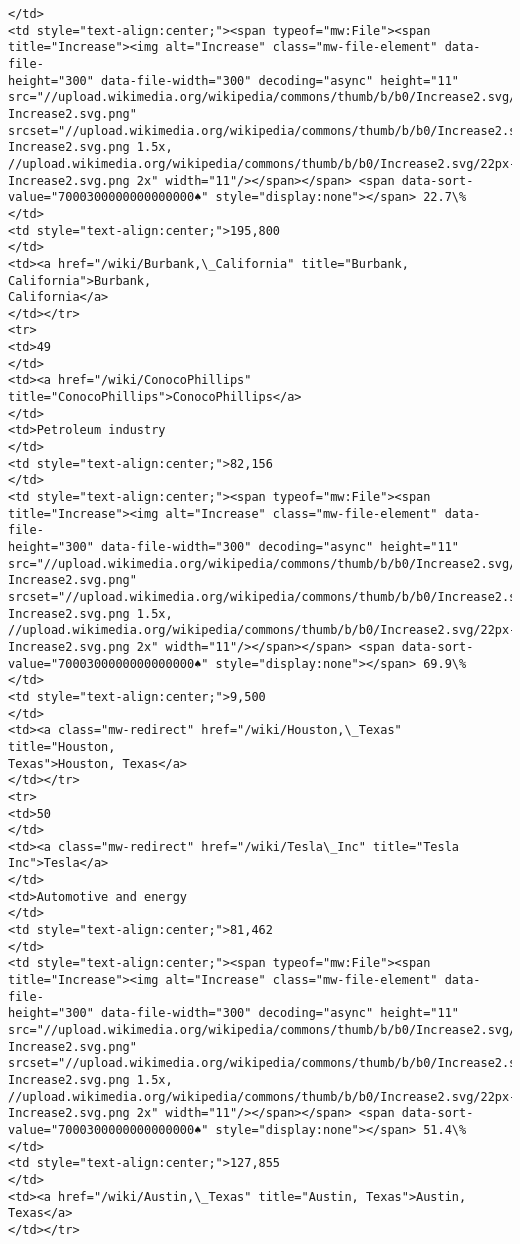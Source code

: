 \documentclass[11pt]{article}
\begin{document}
\begin{Verbatim}[commandchars=\\\{\}]
</td>
<td style="text-align:center;"><span typeof="mw:File"><span
title="Increase"><img alt="Increase" class="mw-file-element" data-file-
height="300" data-file-width="300" decoding="async" height="11"
src="//upload.wikimedia.org/wikipedia/commons/thumb/b/b0/Increase2.svg/11px-
Increase2.svg.png"
srcset="//upload.wikimedia.org/wikipedia/commons/thumb/b/b0/Increase2.svg/17px-
Increase2.svg.png 1.5x,
//upload.wikimedia.org/wikipedia/commons/thumb/b/b0/Increase2.svg/22px-
Increase2.svg.png 2x" width="11"/></span></span> <span data-sort-
value="7000300000000000000♠" style="display:none"></span> 22.7\%
</td>
<td style="text-align:center;">195,800
</td>
<td><a href="/wiki/Burbank,\_California" title="Burbank, California">Burbank,
California</a>
</td></tr>
<tr>
<td>49
</td>
<td><a href="/wiki/ConocoPhillips" title="ConocoPhillips">ConocoPhillips</a>
</td>
<td>Petroleum industry
</td>
<td style="text-align:center;">82,156
</td>
<td style="text-align:center;"><span typeof="mw:File"><span
title="Increase"><img alt="Increase" class="mw-file-element" data-file-
height="300" data-file-width="300" decoding="async" height="11"
src="//upload.wikimedia.org/wikipedia/commons/thumb/b/b0/Increase2.svg/11px-
Increase2.svg.png"
srcset="//upload.wikimedia.org/wikipedia/commons/thumb/b/b0/Increase2.svg/17px-
Increase2.svg.png 1.5x,
//upload.wikimedia.org/wikipedia/commons/thumb/b/b0/Increase2.svg/22px-
Increase2.svg.png 2x" width="11"/></span></span> <span data-sort-
value="7000300000000000000♠" style="display:none"></span> 69.9\%
</td>
<td style="text-align:center;">9,500
</td>
<td><a class="mw-redirect" href="/wiki/Houston,\_Texas" title="Houston,
Texas">Houston, Texas</a>
</td></tr>
<tr>
<td>50
</td>
<td><a class="mw-redirect" href="/wiki/Tesla\_Inc" title="Tesla Inc">Tesla</a>
</td>
<td>Automotive and energy
</td>
<td style="text-align:center;">81,462
</td>
<td style="text-align:center;"><span typeof="mw:File"><span
title="Increase"><img alt="Increase" class="mw-file-element" data-file-
height="300" data-file-width="300" decoding="async" height="11"
src="//upload.wikimedia.org/wikipedia/commons/thumb/b/b0/Increase2.svg/11px-
Increase2.svg.png"
srcset="//upload.wikimedia.org/wikipedia/commons/thumb/b/b0/Increase2.svg/17px-
Increase2.svg.png 1.5x,
//upload.wikimedia.org/wikipedia/commons/thumb/b/b0/Increase2.svg/22px-
Increase2.svg.png 2x" width="11"/></span></span> <span data-sort-
value="7000300000000000000♠" style="display:none"></span> 51.4\%
</td>
<td style="text-align:center;">127,855
</td>
<td><a href="/wiki/Austin,\_Texas" title="Austin, Texas">Austin, Texas</a>
</td></tr>

\end{Verbatim}
\end{document}
